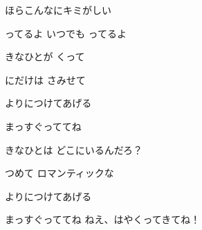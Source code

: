 \documentclass[14pt]{ltjsarticle}
\begin{document}
{  ほらこんなにキミがしい
  \jisho{}

  ってるよ いつでも ってるよ
  \jisho{}

\item
  きなひとが くって
  \jisho{}

  にだけは さみせて
  \jisho{}

  よりにつけてあげる
  \jisho{}


  まっすぐっててね
  \jisho{}

\item
  きなひとは どこにいるんだろ？
  \jisho{}

  つめて ロマンティックな
  \jisho{}

  よりにつけてあげる
  \jisho{}


まっすぐっててね ねえ、はやくってきてね！
  \jisho{}

}
\end{document}
